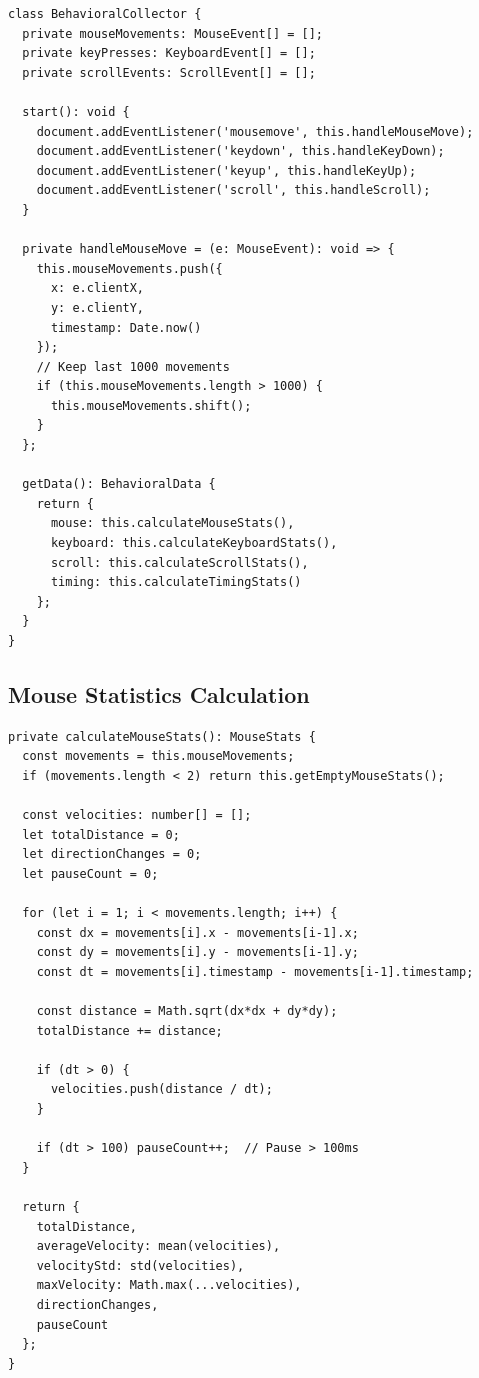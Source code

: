 \begin{verbatim}
class BehavioralCollector {
  private mouseMovements: MouseEvent[] = [];
  private keyPresses: KeyboardEvent[] = [];
  private scrollEvents: ScrollEvent[] = [];
  
  start(): void {
    document.addEventListener('mousemove', this.handleMouseMove);
    document.addEventListener('keydown', this.handleKeyDown);
    document.addEventListener('keyup', this.handleKeyUp);
    document.addEventListener('scroll', this.handleScroll);
  }
  
  private handleMouseMove = (e: MouseEvent): void => {
    this.mouseMovements.push({
      x: e.clientX,
      y: e.clientY,
      timestamp: Date.now()
    });
    // Keep last 1000 movements
    if (this.mouseMovements.length > 1000) {
      this.mouseMovements.shift();
    }
  };
  
  getData(): BehavioralData {
    return {
      mouse: this.calculateMouseStats(),
      keyboard: this.calculateKeyboardStats(),
      scroll: this.calculateScrollStats(),
      timing: this.calculateTimingStats()
    };
  }
}
\end{verbatim}

\subsection{Mouse Statistics Calculation}

\begin{verbatim}
private calculateMouseStats(): MouseStats {
  const movements = this.mouseMovements;
  if (movements.length < 2) return this.getEmptyMouseStats();

  const velocities: number[] = [];
  let totalDistance = 0;
  let directionChanges = 0;
  let pauseCount = 0;

  for (let i = 1; i < movements.length; i++) {
    const dx = movements[i].x - movements[i-1].x;
    const dy = movements[i].y - movements[i-1].y;
    const dt = movements[i].timestamp - movements[i-1].timestamp;
    
    const distance = Math.sqrt(dx*dx + dy*dy);
    totalDistance += distance;
    
    if (dt > 0) {
      velocities.push(distance / dt);
    }
    
    if (dt > 100) pauseCount++;  // Pause > 100ms
  }

  return {
    totalDistance,
    averageVelocity: mean(velocities),
    velocityStd: std(velocities),
    maxVelocity: Math.max(...velocities),
    directionChanges,
    pauseCount
  };
}
\end{verbatim}

